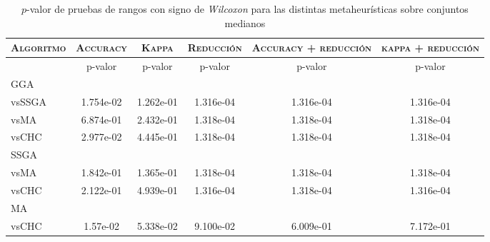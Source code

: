 \begin{table}[h!]
\centering
\begin{adjustbox}{max width =\textwidth}
\begin{tabular}{l c c c c c}
\hline
	\textsc{Algoritmo}
	& \multicolumn{1}{c}{\textsc{Accuracy}}
	& \multicolumn{1}{c}{\textsc{Kappa}}
	& \multicolumn{1}{c}{\textsc{Reducción}} 
	& \multicolumn{1}{c}{\textsc{Accuracy + reducción}} 
	& \multicolumn{1}{c}{\textsc{kappa + reducción}} \\
\hline
\hline

 & p-valor & p-valor & p-valor & p-valor & p-valor \\

GGA \\
vsSSGA & 1.754e-02 & 1.262e-01 & 1.316e-04 & 1.316e-04 & 1.316e-04 \\ 
vsMA & 6.874e-01 & 2.432e-01 & 1.318e-04 & 1.318e-04 & 1.318e-04 \\
vsCHC & 2.977e-02 & 4.445e-01 & 1.318e-04 & 1.318e-04 & 1.318e-04 \\ 

\hline

SSGA \\
vsMA & 1.842e-01 & 1.365e-01 & 1.318e-04 & 1.318e-04 & 1.318e-04 \\
vsCHC & 2.122e-01 & 4.939e-01 & 1.316e-04 & 1.318e-04 & 1.316e-04 \\

\hline

MA \\
vsCHC & 1.57e-02 & 5.338e-02 & 9.100e-02 & 6.009e-01 & 7.172e-01 \\ 

\hline


\end{tabular}
\end{adjustbox}
\caption[Pruebas de \emph{Wilcoxon} entre las metaheurísticas para conjuntos pequeños]{$p$-valor de pruebas de rangos con signo de \emph{Wilcoxon} para las distintas metaheurísticas sobre conjuntos medianos}
\label{wilcox-meta-med}
\end{table}

